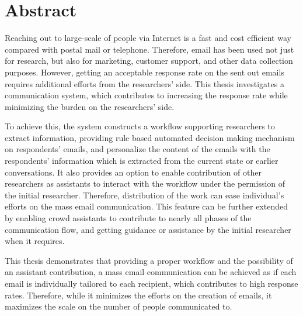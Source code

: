 
{}
{}	

\chapter*{Abstract}

Reaching out to large-scale of people via Internet is a fast and cost efficient way compared with postal mail or telephone. Therefore, email has been used not just for research, but also for marketing, customer support, and other data collection purposes. However, getting an acceptable response rate on the sent out emails requires additional efforts from the researchers' side. This thesis investigates a communication system, which contributes to increasing the response rate while minimizing the burden on the researchers' side. 
\vspace{1cm}

To achieve this, the system constructs a workflow supporting researchers to extract information, providing rule based automated decision making mechanism on respondents' emails, and personalize the content of the emails with the respondents' information which is extracted from the current state or earlier conversations. It also provides an option to enable contribution of other researchers as assistants to interact with the workflow under the permission of the initial researcher. Therefore, distribution of the work can ease individual's efforts on the mass email communication. This feature can be further extended by enabling crowd assistants to contribute to nearly all phases of the communication flow, and getting guidance or assistance by the initial researcher when it requires.
\vspace{1cm}

This thesis demonstrates that providing a proper workflow and the possibility of an assistant contribution, a mass email communication can be achieved as if each email is individually tailored to each recipient, which contributes to high response rates. Therefore, while it minimizes the efforts on the creation of emails, it maximizes the scale on the number of people communicated to.
